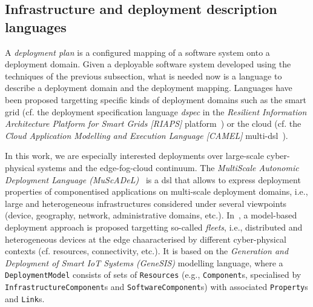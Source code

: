\documentclass[conference]{IEEEtran}
\begin{document}
\subsection{Infrastructure and deployment description languages}
\label{sec:rw:depdesc}

A \emph{deployment plan} is a configured mapping of a software system onto a deployment domain.
%
Given a deployable software system developed using the techniques of the previous subsection,
 what is needed now is a language to describe a deployment domain 
 and the deployment mapping.
%
Languages have been proposed 
 targetting specific kinds of deployment domains
 such as the smart grid (cf. the deployment specification language \emph{dspec} in the \emph{Resilient Information Architecture Platform for Smart Grids [RIAPS]} platform~\cite{DBLP:conf/coins/GhoshTKKL22})
 or the cloud (cf. the \emph{Cloud Application Modelling and Execution Language [CAMEL]} multi-\ac{dsl}~\cite{DBLP:journals/jcloudc/AchilleosKRKDOS19}).

In this work,
 we are especially interested deployments over large-scale cyber-physical systems and the edge-fog-cloud continuum.
%
The \emph{MultiScale Autonomic Deployment Language (MuScADeL)}~\cite{DBLP:conf/compsac/BoujbelRLTAL14/muscadel}
 is a \ac{dsl} that allows to express deployment properties of 
 componentised applications on multi-scale deployment domains, i.e., large and heterogeneous infrastructures considered under several viewpoints (device, geography, network, administrative domains, etc.).
%
In~\cite{DBLP:journals/sosym/SongDFSF22},
  a model-based deployment approach is proposed
  targetting so-called \emph{fleets}, i.e.,
  distributed and heterogeneous devices at the edge chaaracterised by different cyber-physical contexts (cf. resources, connectivity, etc.).
%
It is based on the \emph{Generation and Deployment
of Smart IoT Systems (GeneSIS)} modelling language, where a \texttt{DeploymentModel} consists of sets of \texttt{Resources} (e.g., \texttt{Component}s, specialised by \texttt{InfrastructureComponent}s and \texttt{SoftwareComponent}s) with associated \texttt{Property}s and \texttt{Link}s.
\end{document}
